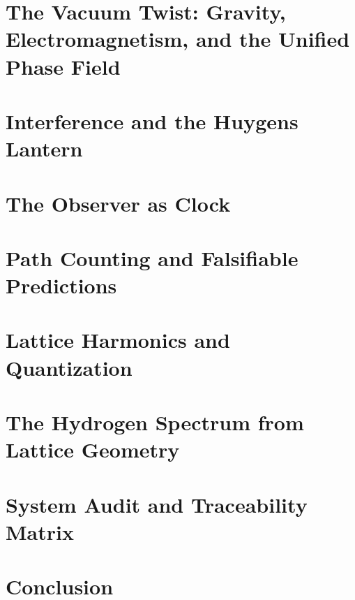 \documentclass[12pt, letterpaper]{article}
\begin{document}
\section{The Vacuum Twist: Gravity, Electromagnetism, and the Unified Phase Field}


\section{Interference and the Huygens Lantern}


\section{The Observer as Clock}


\section{Path Counting and Falsifiable Predictions}


\section{Lattice Harmonics and Quantization}


\section{The Hydrogen Spectrum from Lattice Geometry}


\section{System Audit and Traceability Matrix}


\section{Conclusion}




\end{document}

